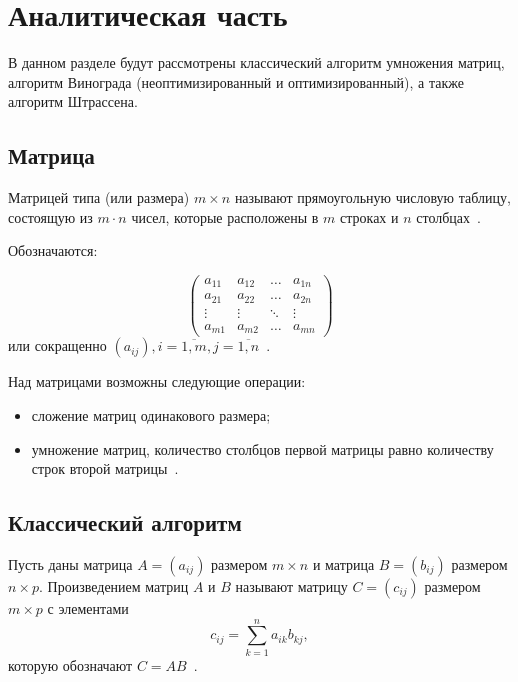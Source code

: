 \chapter{Аналитическая часть}

В данном разделе будут рассмотрены классический алгоритм умножения матриц, алгоритм Винограда (неоптимизированный и оптимизированный), а также алгоритм Штрассена.

\section{Матрица}
Матрицей типа (или размера) $m \times n$ называют прямоугольную числовую таблицу, состоящую из $m \cdot n$ чисел, которые расположены в $m$ строках и $n$ столбцах~\cite{about-matrix}.

Обозначаются:

\begin{equation}
	\begin{pmatrix}
		a_{11} & a_{12} & \ldots & a_{1n}\\
		a_{21} & a_{22} & \ldots & a_{2n}\\
		\vdots & \vdots & \ddots & \vdots\\
		a_{m1} & a_{m2} & \ldots & a_{mn}
	\end{pmatrix}
\end{equation}
или сокращенно $(a_{ij}), i = \overline{1,m}, j = \overline{1,n}$~\cite{about-matrix}.

Над матрицами возможны следующие операции:
\begin{itemize}
    \item сложение матриц одинакового размера;
    \item умножение матриц, количество столбцов первой матрицы равно количеству строк второй матрицы~\cite{about-matrix}.
\end{itemize}

\section{Классический алгоритм}

Пусть даны матрица $A = (a_{ij})$ размером $m \times n$ и матрица $B = (b_{ij})$ размером $n \times p$.
Произведением матриц $A$ и $B$ называют матрицу $C = (c_{ij})$ размером $m \times p$ с элементами
\begin{equation}
    \label{eqn:classic-mul}
    c_{ij} = \sum_{k=1}^{n}a_{ik}b_{kj},
\end{equation}
которую обозначают $C = AB$~\cite{about-matrix}.

